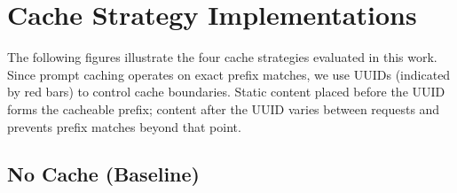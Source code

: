 \documentclass{article}
\theoremstyle{plain}
\theoremstyle{definition}
\theoremstyle{remark}
\begin{document}
\newpage
\section{Cache Strategy Implementations}
\label{app:cache_strategies}

The following figures illustrate the four cache strategies evaluated in this work. Since prompt caching operates on exact prefix matches, we use UUIDs (indicated by red bars) to control cache boundaries. Static content placed before the UUID forms the cacheable prefix; content after the UUID varies between requests and prevents prefix matches beyond that point.


\subsection{No Cache (Baseline)}
\label{app:no_cache}
\end{document}
